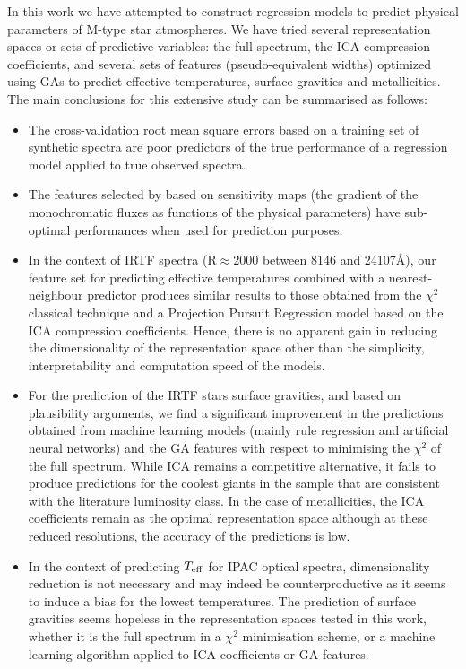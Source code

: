 
In this work we have attempted to construct regression models to
predict physical parameters of M-type star atmospheres. We have tried
several representation spaces or sets of predictive variables: the
full spectrum, the ICA compression coefficients, and several sets of
features (pseudo-equivalent widths) optimized using GAs to predict
effective temperatures, surface gravities and metallicities. The main
conclusions for this extensive study can be summarised as follows:
\begin{itemize}

\item The cross-validation root mean square errors based on a training set of synthetic spectra  are poor predictors of the true performance of a regression model applied to true observed spectra.

\item The features selected by \cite{cesetti} based on sensitivity maps (the gradient of the monochromatic fluxes as functions of the physical parameters) have sub-optimal performances when used for prediction purposes.

\item In the context of IRTF spectra (R$\approx$2000 between 8146 and 24107\AA), our feature set for predicting effective temperatures combined with a nearest-neighbour predictor produces similar results to those obtained from the $\chi^2$ classical technique and a Projection Pursuit Regression model based on the ICA compression coefficients. Hence, there is no apparent gain in reducing the dimensionality of the representation space other than the simplicity, interpretability and computation speed of the models.   

\item For the prediction of the IRTF stars surface gravities, and based on plausibility arguments, we find a significant improvement in the predictions obtained from machine learning models (mainly rule regression and artificial neural networks) and the GA features with respect to minimising the $\chi^2$ of the full spectrum. While ICA remains a competitive alternative, it fails to produce predictions for the coolest giants in the sample that are consistent with the literature luminosity class. In the case of metallicities, the ICA coefficients remain as the optimal representation space although at these reduced resolutions, the accuracy of the predictions is low. 

\item In the context of predicting $T_{\rm eff}$ for IPAC optical spectra, dimensionality reduction is not necessary and may indeed be counterproductive as it seems to induce a bias for the lowest temperatures. The prediction of surface gravities seems hopeless in the representation spaces tested in this work, whether it is the full spectrum in a $\chi^2$ minimisation scheme, or a machine learning algorithm applied to ICA coefficients or GA features.


\end{itemize}
